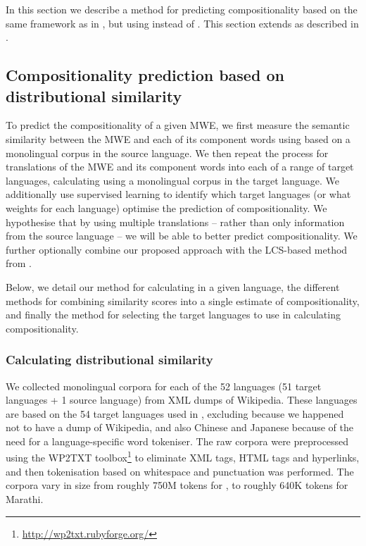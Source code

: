 \documentclass[output=paper,modfonts,nonflat]{langsci/langscibook}
\begin{document}
In this section we describe a method for predicting compositionality
based on the same framework as in , but using
 instead of . This section
extends \cite{DBLP:conf/eacl/SalehiCB14} as described in
.

\subsection{Compositionality prediction based on distributional similarity\label{sec:distsimmodel}}

To predict the compositionality of a given MWE, we first measure the
semantic similarity between the MWE and each of its component words
using  based on a monolingual corpus in the
source language.  We then repeat the process for translations of the
MWE and its component words into each of a range of target languages,
calculating  using a monolingual corpus in
the target language. We additionally use supervised learning to
identify which target languages (or what weights for each language)
optimise the prediction of compositionality. We hypothesise that by
using multiple translations -- rather than only information from the
source language -- we will be able to better predict
compositionality. We further optionally combine our proposed approach
with the LCS-based  method from
.

Below, we detail our method for calculating 
in a given language, the different methods for combining similarity
scores into a single estimate of compositionality, and finally the
method for selecting the target languages to use in calculating
compositionality.


\subsubsection{Calculating distributional similarity\label{sec:ds:calculating}}

We collected monolingual corpora for each of the 52 languages (51 target
languages + 1 source language) from XML dumps of Wikipedia. These
languages are based on the 54 target languages used in
, excluding  because we happened not to
have a dump of  Wikipedia, and also Chinese and Japanese
because of the need for a language-specific word tokeniser. The raw
corpora were preprocessed using the WP2TXT
toolbox\footnote{\smaller\url{http://wp2txt.rubyforge.org/}} to
eliminate XML tags, HTML tags and hyperlinks, and then tokenisation
based on whitespace and punctuation was performed. The corpora vary in
size from roughly 750M tokens for , to roughly 640K tokens for
Marathi.
\end{document}

